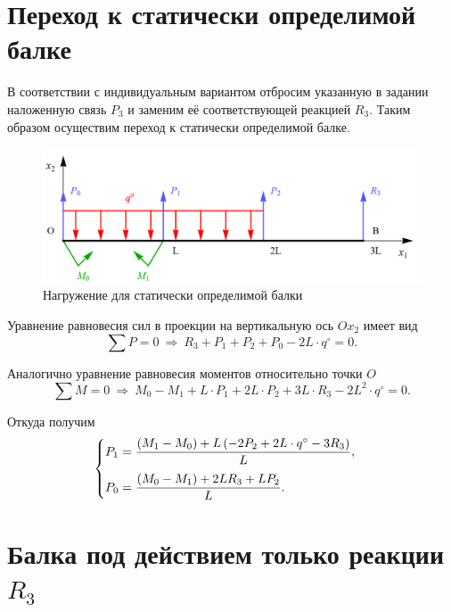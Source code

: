 \documentclass[12pt, a4paper]{article}
\begin{document}
	\section{Переход к статически определимой балке}
	
	В соответствии с индивидуальным вариантом отбросим указанную в задании наложенную связь $P_3$ и заменим её соответствующей реакцией $R_3$. Таким образом осуществим переход к статически определимой балке.
	
	\begin{figure}[!h]
		\centering
		\includegraphics[width=0.75\linewidth]{plot-3}
		\caption{Нагружение для статически определимой балки}
	\end{figure}
	
	\newpage
	
	Уравнение равновесия сил в проекции на вертикальную ось $Ox_2$ имеет вид
	\begin{equation*}
		\sum P = 0 \ \Rightarrow \ R_3 + P_1 + P_2 + P_0 - 2L \cdot q^{\circ} = 0.
	\end{equation*}
	
	Аналогично уравнение равновесия моментов относительно точки $O$
	\begin{equation*}
		\sum M = 0 \ \Rightarrow \ M_0 - M_1 + L \cdot P_1 + 2 L \cdot P_2 + 3 L \cdot R_3 - 2 L^2 \cdot q^{\circ} = 0.
	\end{equation*}
	
	Откуда получим
	\begin{equation}
		\begin{cases} \vspace{0.75em}
			P_1 = \dfrac{\left( M_1 - M_0 \right)  + L\left(-2 P_2 + 2 L \cdot q^{\circ} - 3 R_3 \right)}{L}, \\ 
			P_0 = \dfrac{\left( M_0 - M_1 \right) + 2 L R_3 + L P_2}{L}. \\
		\end{cases}
		\label{eqP0P1}
	\end{equation}
	
	\section{Балка под действием только реакции $R_3$}
	
\end{document}
